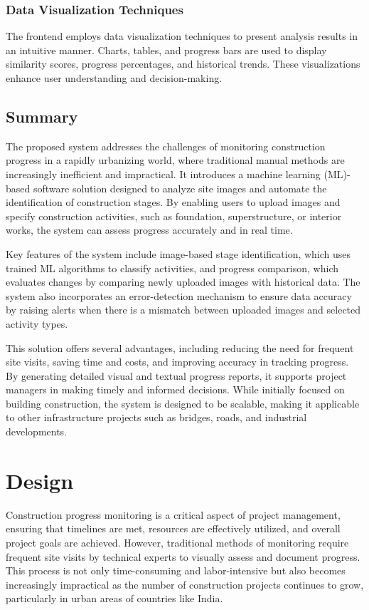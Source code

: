 \subsection{Data Visualization Techniques}
The frontend employs data visualization techniques to present analysis results in an intuitive manner. Charts, tables, and progress bars are used to display similarity scores, progress percentages, and historical trends. These visualizations enhance user understanding and decision-making.

\section{Summary}
The proposed system addresses the challenges of monitoring construction progress in a rapidly urbanizing world, where traditional manual methods are increasingly inefficient and impractical. It introduces a machine learning (ML)-based software solution designed to analyze site images and automate the identification of construction stages. By enabling users to upload images and specify construction activities, such as foundation, superstructure, or interior works, the system can assess progress accurately and in real time.

Key features of the system include image-based stage identification, which uses trained ML algorithms to classify activities, and progress comparison, which evaluates changes by comparing newly uploaded images with historical data. The system also incorporates an error-detection mechanism to ensure data accuracy by raising alerts when there is a mismatch between uploaded images and selected activity types.

This solution offers several advantages, including reducing the need for frequent site visits, saving time and costs, and improving accuracy in tracking progress. By generating detailed visual and textual progress reports, it supports project managers in making timely and informed decisions. While initially focused on building construction, the system is designed to be scalable, making it applicable to other infrastructure projects such as bridges, roads, and industrial developments.



\chapter{Design}

Construction progress monitoring is a critical aspect of project management, ensuring that timelines are met, resources are effectively utilized, and overall project goals are achieved. However, traditional methods of monitoring require frequent site visits by technical experts to visually assess and document progress. This process is not only time-consuming and labor-intensive but also becomes increasingly impractical as the number of construction projects continues to grow, particularly in urban areas of countries like India.

